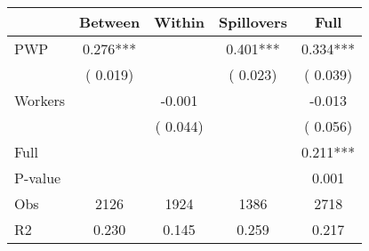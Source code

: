 
\begin{tabular}{l*{4}{c}}\hline&\multicolumn{1}{c}{Between}&\multicolumn{1}{c}{Within}&\multicolumn{1}{c}{Spillovers}&\multicolumn{1}{c}{Full}\\ \hline
 PWP           &              0.276***      &                                               &        0.401*** &         0.334***                            \\ 
                               &        (       0.019)           &                                       &       (       0.023)     &      (       0.039)                                           \\ 
 Workers       &                                               &       -0.001    &                                &            -0.013                            \\ 
                               &                                               & (       0.044)                  &                                        &      (       0.056)                                           \\ 
\hline                                                                                                                                                                                                                                            
 Full                  &                                               &                                               &                                        &             0.211***                                     \\ 
 P-value               &                                               &                                               &                                        &             0.001                                           \\ 
 Obs                   &               2126               &       1924                       &       1386                &              2718                                               \\ 
 R2                    &                      0.230              &              0.145                      &              0.259               &                     0.217                                              \\ 
\hline \end{tabular}                                                                                                                                                                                                              